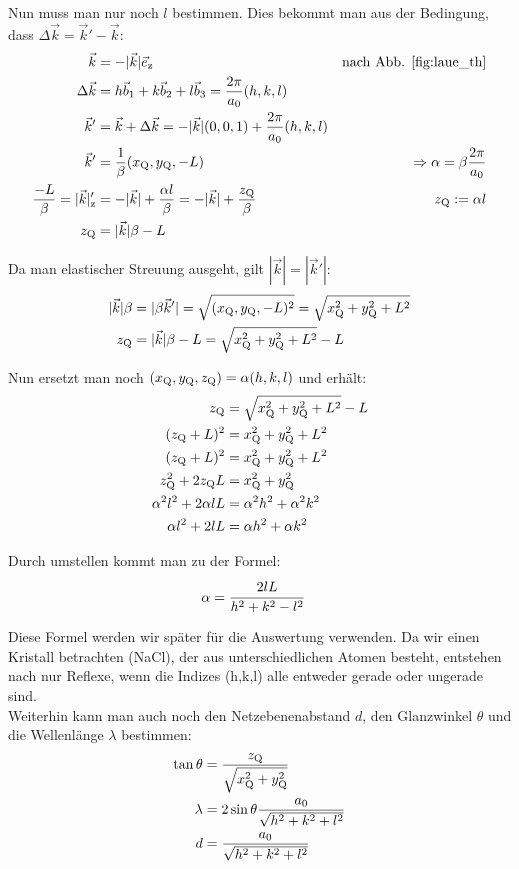 Nun muss man nur noch $l$ bestimmen. Dies bekommt man aus der Bedingung, dass $\Delta\vec{k} = \vec{k}' -\vec{k}$:
\begin{align*}
\vec{k} &= -|\vec{k}|\vec{e}_\mathrm{z} & \text{nach Abb. \ref{fig:laue_th}}\\
\Delta\vec{k} &= h\vec{b}_1 + k\vec{b}_2 + l\vec{b}_3 = \frac{2\pi}{a_0} (h, k, l)\\
\vec{k}' &= \vec{k} + \Delta\vec{k} = -|\vec{k}| (0,0,1) + \frac{2\pi}{a_0} (h,k,l)\\
\vec{k}' &= \frac{1}{\beta} (x_\mathrm{Q},y_\mathrm{Q},-L) &\Rightarrow \alpha = \beta \frac{2\pi}{a_0}\\
\frac{-L}{\beta} = |\vec{k}|_\mathrm{z}' &= -|\vec{k}| +\frac{\alpha l}{\beta} = -|\vec{k}| + \frac{z_\mathrm{Q}}{\beta} & z_\mathrm{Q} := \alpha l\\
z_\mathrm{Q} &= |\vec{k}|\beta - L\\
\end{align*}

Da man elastischer Streuung ausgeht, gilt $|\vec{k}| = |\vec{k}'|$: 
\begin{align}
|\vec{k}|\beta &= |\beta\vec{k}'| = \sqrt{(x_\mathrm{Q}, y_\mathrm{Q},-L)^2} = \sqrt{x_\mathrm{Q}^2 + y_\mathrm{Q}^2 + L^2} \nonumber\\
z_\mathrm{Q} &= |\vec{k}|\beta - L = \sqrt{x_\mathrm{Q}^2 + y_\mathrm{Q}^2 + L^2} - L
\label{eq:zq}
\end{align}

Nun ersetzt man noch $(x_\mathrm{Q}, y_\mathrm{Q}, z_\mathrm{Q}) = \alpha (h,k,l)$ und erhält:
\begin{align*}
z_\mathrm{Q} &= \sqrt{x_\mathrm{Q}^2 + y_\mathrm{Q}^2 + L^2} - L\\
(z_\mathrm{Q}+L)^2 &= x_\mathrm{Q}^2 + y_\mathrm{Q}^2 + L^2\\
(z_\mathrm{Q}+L)^2 &= x_\mathrm{Q}^2 + y_\mathrm{Q}^2 + L^2\\
z_\mathrm{Q}^2+2z_\mathrm{Q}L &= x_\mathrm{Q}^2 + y_\mathrm{Q}^2\\
\alpha^2 l^2+2\alpha l L &= \alpha^2 h^2 + \alpha^2 k^2\\
\alpha l^2+2 l L &= \alpha h^2 + \alpha k^2
\end{align*}  

Durch umstellen kommt man zu der Formel:
\begin{align}
\alpha &= \cfrac{2lL}{h^2 + k^2 - l^2}
\label{eq:alpha}
\end{align}

Diese Formel werden wir später für die Auswertung verwenden. Da wir einen Kristall betrachten (NaCl), der aus unterschiedlichen Atomen besteht, entstehen nach \cite{ld} nur Reflexe, wenn  die Indizes (h,k,l) alle entweder gerade oder ungerade sind.\\

Weiterhin kann man auch noch den Netzebenenabstand $d$, den Glanzwinkel $\theta$ und die Wellenlänge $\lambda$ bestimmen\cite{ld}:
\begin{align}
\tan{\theta} &= \frac{z_\mathrm{Q}}{\sqrt{x_\mathrm{Q}^2+y_\mathrm{Q}^2}}\label{eq:theta}\\
\lambda &= 2\sin{\theta} \frac{a_0}{\sqrt{h^2+k^2+l^2}}\label{eq:lambda}\\
d &= \frac{a_0}{\sqrt{h^2+k^2+l^2}}\label{eq:d}
\end{align}